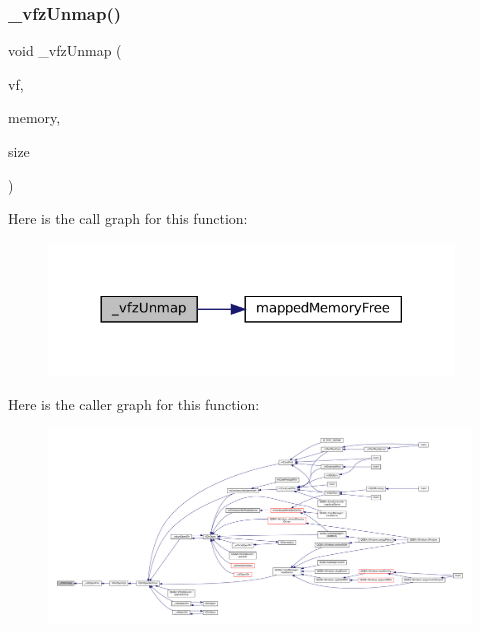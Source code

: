 \subsubsection{\texorpdfstring{\+\_\+vfz\+Unmap()}{\_vfzUnmap()}}
{\footnotesize\ttfamily void \+\_\+vfz\+Unmap (\begin{DoxyParamCaption}\item[{struct V\+File $\ast$}]{vf,  }\item[{void $\ast$}]{memory,  }\item[{size\+\_\+t}]{size }\end{DoxyParamCaption})\hspace{0.3cm}{\ttfamily [static]}}

Here is the call graph for this function\+:
\nopagebreak
\begin{figure}[H]
\begin{center}
\leavevmode
\includegraphics[width=305pt]{vfs-zip_8c_a5a60c5c59fcbcaaa9d72998904f495a0_cgraph}
\end{center}
\end{figure}
Here is the caller graph for this function\+:
\nopagebreak
\begin{figure}[H]
\begin{center}
\leavevmode
\includegraphics[width=350pt]{vfs-zip_8c_a5a60c5c59fcbcaaa9d72998904f495a0_icgraph}
\end{center}
\end{figure}
\mbox{\label{vfs-zip_8c_aa2e7a8e1946bc438fc2cd474533b9e56}} 
